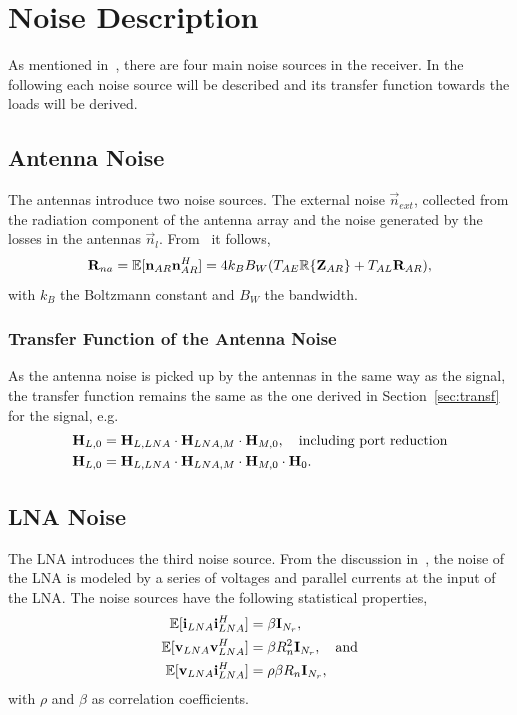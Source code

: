 \section{Noise Description}

As mentioned in~\cite{Yahia2013}, there are four main noise sources in the receiver.
In the following each noise source will be described and its transfer function towards the loads will be derived. 

\subsection{Antenna Noise}
\label{sec:antenna_noise}

The antennas introduce two noise sources.
The external noise $\vec{n}_{ext}$, collected from the radiation component of the antenna array and the noise generated by the losses in the antennas $\vec{n}_l$.
From~\cite{Twiss1955} it follows, 
\begin{equation}
\label{eq:cov_ant}
\mathbf{R}_{na} = \mathbb{E}[\mathbf{n}_{AR}\mathbf{n}_{AR}^H] = 4 k_B B_W(T_{AE}\mathbb{R}\{\mathbf{Z}_{AR}\}+T_{AL}\mathbf{R}_{AR}),
\end{equation}
with $k_B$ the Boltzmann constant and $B_W$ the bandwidth.

\subsubsection{Transfer Function of the Antenna Noise}
\label{sec:antenna_noise_transf}
As the antenna noise is picked up by the antennas in the same way as the signal, the transfer function remains the same as the one derived in Section~\ref{sec:transf} for the signal, e.g.
\begin{align}
\mathbf{H}_{L,0} &= \mathbf{H}_{L,LNA}\cdot\mathbf{H}_{LNA,M}\cdot\mathbf{H}_{M,0},\quad\text{including port reduction}\\\nonumber
\mathbf{H}_{L,0} &= \mathbf{H}_{L,LNA}\cdot\mathbf{H}_{LNA,M}\cdot\mathbf{H}_{M,0}\cdot\mathbf{H}_{0}.
\end{align}

\subsection{LNA Noise}
\label{sec:lna_noise}

The LNA introduces the third noise source.
From the discussion in~\cite{Nossek}, the noise of the LNA is modeled by a series of voltages and parallel currents at the input of the LNA.
The noise sources have the following statistical properties,
\begin{align}
\label{eq:cov_lna}
\mathbb{E}[\mathbf{i}_{LNA}\mathbf{i}_{LNA}^H] &= \beta \mathbf{I}_{N_r},\\\nonumber
\mathbb{E}[\mathbf{v}_{LNA}\mathbf{v}_{LNA}^H] &= \beta R_n^2\mathbf{I}_{N_r},\quad\text{and}\\\nonumber
\mathbb{E}[\mathbf{v}_{LNA}\mathbf{i}_{LNA}^H] &= \rho \beta R_n\mathbf{I}_{N_r},
\end{align}
with $\rho$ and $\beta$ as correlation coefficients.

